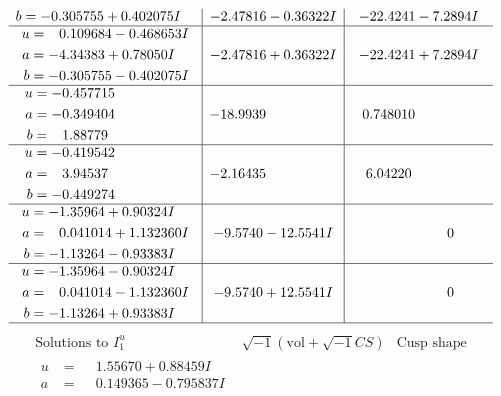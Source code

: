 \documentclass[1p]{elsarticle_modified}
\theoremstyle{definition}
\newcommand{\I}{\sqrt{-1}}
\begin{document}
$$\begin{array}{c|c|c}
\begin{aligned}
b &= -0.305755 + 0.402075 I\end{aligned}
 & -2.47816 - 0.36322 I & -22.4241 - 7.2894 I \\ \hline\begin{aligned}
u &= \phantom{-}0.109684 - 0.468653 I \\
a &= -4.34383 + 0.78050 I \\
b &= -0.305755 - 0.402075 I\end{aligned}
 & -2.47816 + 0.36322 I & -22.4241 + 7.2894 I \\ \hline\begin{aligned}
u &= -0.457715\phantom{ +0.000000I} \\
a &= -0.349404\phantom{ +0.000000I} \\
b &= \phantom{-}1.88779\phantom{ +0.000000I}\end{aligned}
 & -18.9939\phantom{ +0.000000I} & \phantom{-}0.748010\phantom{ +0.000000I} \\ \hline\begin{aligned}
u &= -0.419542\phantom{ +0.000000I} \\
a &= \phantom{-}3.94537\phantom{ +0.000000I} \\
b &= -0.449274\phantom{ +0.000000I}\end{aligned}
 & -2.16435\phantom{ +0.000000I} & \phantom{-}6.04220\phantom{ +0.000000I} \\ \hline\begin{aligned}
u &= -1.35964 + 0.90324 I \\
a &= \phantom{-}0.041014 + 1.132360 I \\
b &= -1.13264 - 0.93383 I\end{aligned}
 & -9.5740 - 12.5541 I & \phantom{-0.000000 } 0 \\ \hline\begin{aligned}
u &= -1.35964 - 0.90324 I \\
a &= \phantom{-}0.041014 - 1.132360 I \\
b &= -1.13264 + 0.93383 I\end{aligned}
 & -9.5740 + 12.5541 I & \phantom{-0.000000 } 0\\
 \hline 
 \end{array}$$\newpage$$\begin{array}{c|c|c}  
\text{Solutions to }I^u_{1}& \I (\text{vol} + \sqrt{-1}CS) & \text{Cusp shape}\\
 \hline 
\begin{aligned}
u &= \phantom{-}1.55670 + 0.88459 I \\
a &= \phantom{-}0.149365 - 0.795837 I \\

\end{aligned}
\end{array}$$
\end{document}
